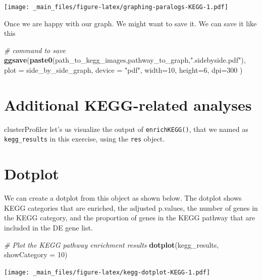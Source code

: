 \documentclass[
]{book}
\newenvironment{Shaded}{\begin{snugshade}}{\end{snugshade}}
\newcommand{\AttributeTok}[1]{\textcolor[rgb]{0.13,0.29,0.53}{#1}}
\newcommand{\CommentTok}[1]{\textcolor[rgb]{0.56,0.35,0.01}{\textit{#1}}}
\newcommand{\DecValTok}[1]{\textcolor[rgb]{0.00,0.00,0.81}{#1}}
\newcommand{\FunctionTok}[1]{\textcolor[rgb]{0.13,0.29,0.53}{\textbf{#1}}}
\newcommand{\NormalTok}[1]{#1}
\newcommand{\StringTok}[1]{\textcolor[rgb]{0.31,0.60,0.02}{#1}}
\begin{document}
\texttt{[image: \_main\_files/figure-latex/graphing-paralogs-KEGG-1.pdf]}

Once we are happy with our graph. We might want to save it. We can save it like this

\begin{Shaded}
\begin{Highlighting}[]
\CommentTok{\# command to save}
\FunctionTok{ggsave}\NormalTok{(}\FunctionTok{paste0}\NormalTok{(path\_to\_kegg\_images,pathway\_to\_graph,}\StringTok{".sidebyside.pdf"}\NormalTok{), }
       \AttributeTok{plot =}\NormalTok{ side\_by\_side\_graph,}
       \AttributeTok{device =} \StringTok{"pdf"}\NormalTok{,}
       \AttributeTok{width=}\DecValTok{10}\NormalTok{,}
       \AttributeTok{height=}\DecValTok{6}\NormalTok{,}
       \AttributeTok{dpi=}\DecValTok{300}
\NormalTok{       )}
\end{Highlighting}
\end{Shaded}

\hypertarget{additional-kegg-related-analyses}{%
\section{Additional KEGG-related analyses}\label{additional-kegg-related-analyses}}

clusterProfiler let's us visualize the output of \texttt{enrichKEGG()}, that we named as \texttt{kegg\_results} in this exercise, using the \texttt{res} object.

\hypertarget{dotplot}{%
\section{Dotplot}\label{dotplot}}

We can create a dotplot from this object as shown below. The dotplot shows KEGG categories that are enriched, the adjusted p.values, the number of genes in the KEGG category, and the proportion of genes in the KEGG pathway that are included in the DE gene list.

\begin{Shaded}
\begin{Highlighting}[]
\CommentTok{\# Plot the KEGG pathway enrichment results}
\FunctionTok{dotplot}\NormalTok{(kegg\_results, }\AttributeTok{showCategory =} \DecValTok{10}\NormalTok{)}
\end{Highlighting}
\end{Shaded}

\texttt{[image: \_main\_files/figure-latex/kegg-dotplot-KEGG-1.pdf]}
\end{document}

